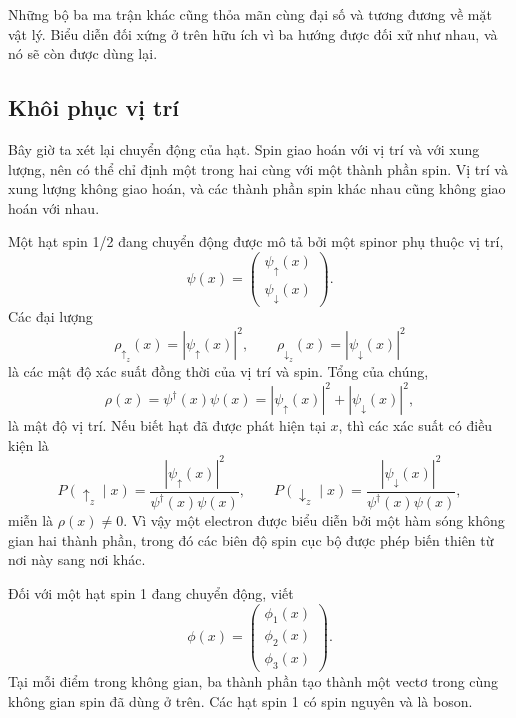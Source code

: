 Những bộ ba ma trận khác cũng thỏa mãn cùng đại số và tương đương về mặt vật lý. Biểu diễn đối xứng ở trên hữu ích vì ba hướng được đối xử như nhau, và nó sẽ còn được dùng lại.

\subsection{Khôi phục vị trí}

Bây giờ ta xét lại chuyển động của hạt. Spin giao hoán với vị trí và với xung lượng, nên có thể chỉ định một trong hai cùng với một thành phần spin. Vị trí và xung lượng không giao hoán, và các thành phần spin khác nhau cũng không giao hoán với nhau.

Một hạt spin 1/2 đang chuyển động được mô tả bởi một spinor phụ thuộc vị trí,
\begin{equation}
\psi(x)=
\begin{pmatrix}
\psi_\uparrow(x)\\
\psi_\downarrow(x)
\end{pmatrix}.
\end{equation}
Các đại lượng
\begin{equation}
\rho_{\uparrow_z}(x)=|\psi_\uparrow(x)|^2,
\qquad
\rho_{\downarrow_z}(x)=|\psi_\downarrow(x)|^2
\end{equation}
là các mật độ xác suất đồng thời của vị trí và spin. Tổng của chúng,
\begin{equation}
\rho(x)=\psi^\dagger(x)\psi(x)
=|\psi_\uparrow(x)|^2+|\psi_\downarrow(x)|^2,
\end{equation}
là mật độ vị trí. Nếu biết hạt đã được phát hiện tại \(x\), thì các xác suất có điều kiện là
\begin{equation}
P(\uparrow_z\mid x)
=
\frac{|\psi_\uparrow(x)|^2}{\psi^\dagger(x)\psi(x)},
\qquad
P(\downarrow_z\mid x)
=
\frac{|\psi_\downarrow(x)|^2}{\psi^\dagger(x)\psi(x)},
\end{equation}
miễn là \(\rho(x)\neq0\). Vì vậy một electron được biểu diễn bởi một hàm sóng không gian hai thành phần, trong đó các biên độ spin cục bộ được phép biến thiên từ nơi này sang nơi khác.

Đối với một hạt spin 1 đang chuyển động, viết
\begin{equation}
\phi(x)=
\begin{pmatrix}
\phi_1(x)\\
\phi_2(x)\\
\phi_3(x)
\end{pmatrix}.
\end{equation}
Tại mỗi điểm trong không gian, ba thành phần tạo thành một vectơ trong cùng không gian spin đã dùng ở trên. Các hạt spin 1 có spin nguyên và là boson.


